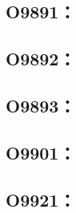 \subsection{O9891：}



\subsection{O9892：}



\clearpage
\subsection{O9893：}



\clearpage
\subsection{O9901：}



\clearpage
\subsection{O9921：}

